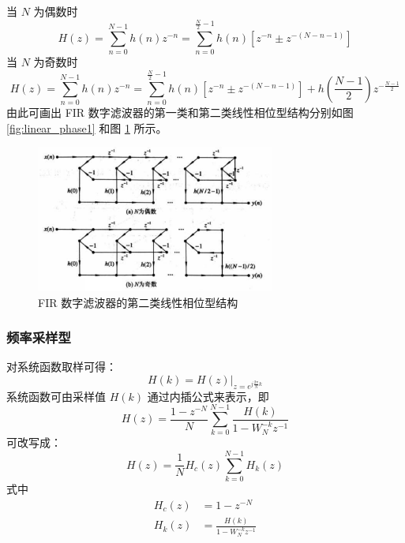 \documentclass[12pt,AutoFakeBold]{article}
\begin{document}
当 $N$ 为偶数时
%
\begin{equation}
H(z)=\sum_{n=0}^{N-1}h(n)z^{-n}=\sum_{n=0}^{\frac{N}{2}-1}h(n)\left[z^{-n}\pm z^{-(N-n-1)}\right]
\end{equation}
%
当 $N$ 为奇数时
%
\begin{equation}
H(z)=\sum_{n=0}^{N-1}h(n)z^{-n}=\sum_{n=0}^{\frac{N}{2}-1}h(n)\left[z^{-n}\pm z^{-(N-n-1)}\right]+h\left(\frac{N-1}{2}\right)z^{-\frac{N-1}{2}}
\end{equation}
%
由此可画出 FIR 数字滤波器的第一类和第二类线性相位型结构分别如图 \ref{fig:linear_phase1} 和图 \ref{fig:linear_phase2} 所示。

\begin{figure}[hbtp]
	\centering
	\includegraphics[width=0.7\textwidth]{figure/linear_phase2.png}
	\caption{FIR 数字滤波器的第二类线性相位型结构} \label{fig:linear_phase2}
\end{figure}

\subsubsection{频率采样型}

对系统函数取样可得：
%
\begin{equation}
H(k)=H(z)|_{z=e^{j\frac{2\pi}{N}k}}
\end{equation}
%
系统函数可由采样值 $H(k)$ 通过内插公式来表示，即
%
\begin{equation}
H(z)=\frac{1-z^{-N}}{N}\sum_{k=0}^{N-1}\frac{H(k)}{1-W_N^{-k}z^{-1}}
\end{equation}
%
可改写成：
%
\begin{equation}
H(z)=\frac{1}{N}H_c(z)\sum_{k=0}^{N-1}H_k(z)
\end{equation}
%
式中
%
\begin{align}
H_c(z) &= 1-z^{-N} \\
H_k(z) &= \frac{H(k)}{1-W_N^{-k}z^{-1}}
\end{align}
%
\end{document}
